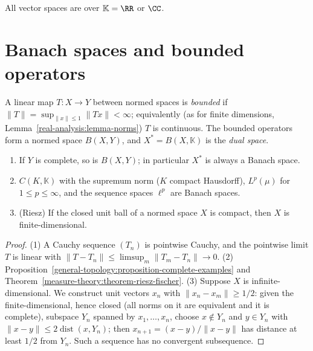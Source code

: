 All vector spaces are over $\mathbb{K} = \RR$ or $\CC$.

\section{Banach spaces and bounded operators}\label{functional-analysis:section-banach}

\begin{definition}\label{functional-analysis:definition-bounded-operator}
A linear map $T \colon X \to Y$ between normed spaces is \emph{bounded} if $\|T\| = \sup_{\|x\| \leq 1}\|Tx\| < \infty$; equivalently (as for finite dimensions,
Lemma~\ref{real-analysis:lemma-norms}) $T$ is continuous. The bounded operators form a normed space $B(X, Y)$, and $X^* = B(X, \mathbb{K})$ is the \emph{dual space}.
\end{definition}

\begin{proposition}\label{functional-analysis:proposition-banach-examples}
\begin{enumerate}
\item If $Y$ is complete, so is $B(X, Y)$; in particular $X^*$ is always a Banach space.
\item $C(K, \mathbb{K})$ with the supremum norm ($K$ compact Hausdorff), $L^p(\mu)$ for $1 \leq p \leq \infty$, and the sequence spaces $\ell^p$ are Banach spaces.
\item (Riesz) If the closed unit ball of a normed space $X$ is compact, then $X$ is finite-dimensional.
\end{enumerate}
\end{proposition}

\begin{proof}
(1) A Cauchy sequence $(T_n)$ is pointwise Cauchy, and the pointwise limit $T$ is linear with $\|T - T_n\| \leq \limsup_m\|T_m - T_n\| \to 0$. (2)
Proposition~\ref{general-topology:proposition-complete-examples} and Theorem~\ref{measure-theory:theorem-riesz-fischer}. (3) Suppose $X$ is infinite-dimensional. We construct unit vectors $x_n$ with
$\|x_n - x_m\| \geq 1/2$: given the finite-dimensional, hence closed (all norms on it are equivalent and it is complete), subspace $Y_n$ spanned by $x_1, \ldots, x_n$, choose $x \notin Y_n$ and $y \in Y_n$ with
$\|x - y\| \leq 2\operatorname{dist}(x, Y_n)$; then $x_{n+1} = (x - y)/\|x - y\|$ has distance at least $1/2$ from $Y_n$. Such a sequence has no convergent subsequence.
\end{proof}

